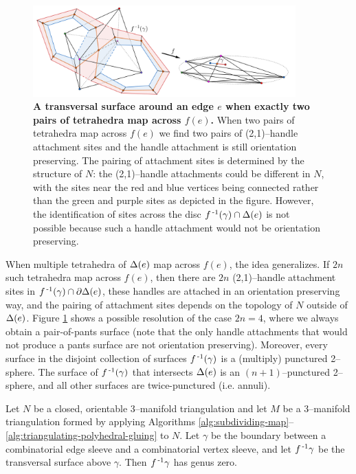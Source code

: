 \begin{figure}[h!]
	\centering
	\includegraphics[width=0.9\textwidth]{figures/pl-indefinite-fold.png}
	\caption{
		\textbf{A transversal surface around an edge $e$ when exactly two pairs of tetrahedra map across $f(e)$.}
		When two pairs of tetrahedra map across $f(e)$ we find two pairs of (2,1)--handle attachment sites and the handle attachment is still orientation preserving.
		The pairing of attachment sites is determined by the structure of $N$: the (2,1)--handle attachments could be different in $N$, with the sites near the red and blue vertices being connected rather than the green and purple sites as depicted in the figure.
		However, the identification of sites across the disc $f^{\,\text{-}1}(\gamma)\cap\Delta(e)$ is not possible because such a handle attachment would not be orientation preserving.
	}
	\label{fig:pl-indefinite-fold}
\end{figure}

When multiple tetrahedra of $\Delta(e)$ map across $f(e)$, the idea generalizes.
If $2n$ such tetrahedra map across $f(e)$, then there are $2n$ (2,1)--handle attachment sites in $f^{\,\text{-}1}(\gamma)\cap\partial\Delta(e)$, these handles are attached in an orientation preserving way, and the pairing of attachment sites depends on the topology of $N$ outside of $\Delta(e)$.
Figure \ref{fig:pl-indefinite-fold} shows a possible resolution of the case $2n=4$, where we always obtain a pair-of-pants surface (note that the only handle attachments that would not produce a pants surface are not orientation preserving).
Moreover, every surface in the disjoint collection of surfaces $f^{\,\text{-}1}(\gamma)$ is a (multiply) punctured 2--sphere.
The surface of $f^{\,\text{-}1}(\gamma)$ that intersects $\Delta(e)$ is an $(n+1)$--punctured 2--sphere, and all other surfaces are twice-punctured (i.e. annuli).



\begin{lem}
	Let $N$ be a closed, orientable 3--manifold triangulation and let $M$ be a 3--manifold triangulation formed by applying Algorithms \ref{alg:subdividing-map}--\ref{alg:triangulating-polyhedral-gluing} to $N$.
	Let $\gamma$ be the boundary between a combinatorial edge sleeve and a combinatorial vertex sleeve, and let $f^{\,\text{-}1}\gamma$ be the transversal surface above $\gamma$.
	Then $f^{\,\text{-}1}\gamma$ has genus zero.
\end{lem}

